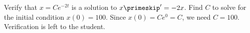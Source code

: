{Verify that $x = C e^{-2t}$ is a solution to $x\primeskip' = -2x$.
Find $C$ to solve for the initial condition $x(0) = 100$.}
{Since $x(0)=Ce^{0}=C$, we need $C=100$. Verification is left to the student.}